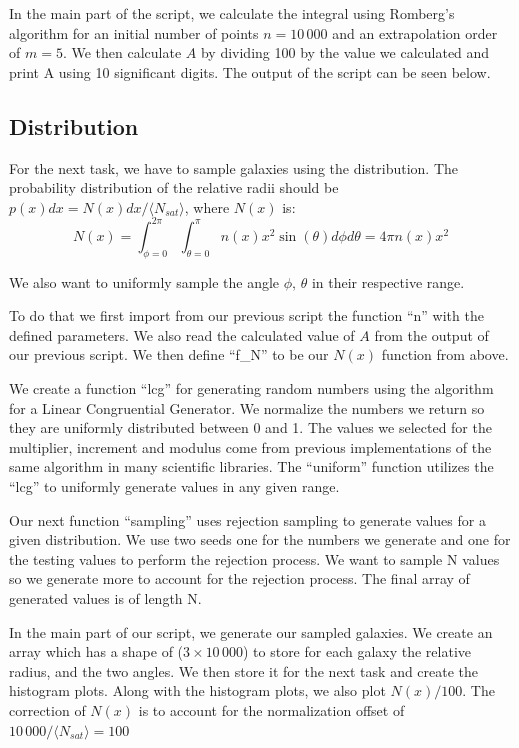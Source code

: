 \documentclass[a4paper,10pt]{article}
\begin{document}


In the main part of the script, we calculate the integral using Romberg's algorithm for an initial number of points $n=10\,000$ and an extrapolation order of $m=5$. We then calculate $A$ by dividing 100 by the value we calculated and print A using 10 significant digits. The output of the script can be seen below. 




\subsection{Distribution}

For the next task, we have to sample galaxies using the distribution. The probability distribution of the relative radii should be $p(x) dx = N(x) dx / \langle N_{sat} \rangle$, where $N(x)$ is:
\begin{equation}
  N(x)= \int_{\phi=0}^{2\pi} \int_{\theta=0}^{\pi} n(x) x^2 \sin(\theta) d\phi d\theta =4 \pi n(x) x^2
\end{equation}

We also want to uniformly sample the angle $\phi,\,\theta$ in their respective range. 

To do that we first import from our previous script the function ``n'' with the defined parameters. We also read the calculated value of $A$ from the output of our previous script. We then define ``f\_N'' to be our $N(x)$ function from above. 

We create a function ``lcg'' for generating random numbers using the algorithm for a Linear Congruential Generator. We normalize the numbers we return so they are uniformly distributed between 0 and 1. The values we selected for the multiplier, increment and modulus come from previous implementations of the same algorithm in many scientific libraries. The ``uniform'' function utilizes the ``lcg'' to uniformly generate values in any given range. 

Our next function ``sampling'' uses rejection sampling to generate values for a given distribution. We use two seeds one for the numbers we generate and one for the testing values to perform the rejection process. We want to sample N values so we generate more to account for the rejection process. The final array of generated values is of length N.



In the main part of our script, we generate our sampled galaxies. We create an array which has a shape of ($3 \times 10\,000$) to store for each galaxy the relative radius, and the two angles. We then store it for the next task and create the histogram plots. Along with the histogram plots, we also plot $N(x)/100$. The correction of $N(x)$ is to account for the normalization offset of $10\,000/\langle N_{sat} \rangle = 100$
\end{document}
